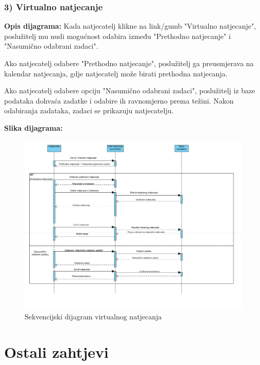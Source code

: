 					\subsubsection{3) Virtualno natjecanje}
					
					\textbf{Opis dijagrama:}
					Kada natjecatelj klikne na link/gumb "Virtualno natjecanje", poslužitelj mu nudi mogućnost odabira između "Prethodno natjecanje" i "Nasumično odabrani zadaci".
					
					Ako natjecatelj odabere "Prethodno natjecanje", poslužitelj ga preusmjerava na kalendar natjecanja, gdje natjecatelj može birati prethodna natjecanja.
					
					Ako natjecatelj odabere opciju "Nasumično odabrani zadaci", poslužitelj iz baze podataka dohvaća zadatke i odabire ih ravnomjerno prema težini. Nakon odabiranja zadataka, zadaci se prikazuju natjecatelju.
					
					\textbf{Slika dijagrama:}
					\begin{figure}[H]
					\centering
					\includegraphics[scale=0.4]{slike/Virtualno natjecanje}
					\caption{Sekvencijski dijagram virtualnog natjecanja}
					\end{figure}
			
					
				
				
	
		\section{Ostali zahtjevi}
		
